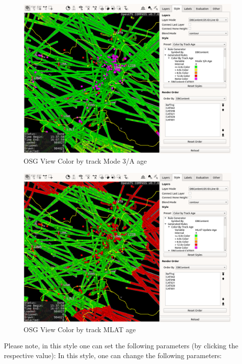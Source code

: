 \begin{figure}[H]
    \hspace*{-1.5cm}
    \includegraphics[width=17cm,frame]{figures/osgview_style_track_m3a_age.png}
  \caption{OSG View Color by track Mode 3/A age}
\end{figure}

\begin{figure}[H]
    \hspace*{-2.5cm}
    \includegraphics[width=19cm,frame]{figures/osgview_style_track_mlt_age.png}
  \caption{OSG View Color by track MLAT age}
\end{figure}

Please note, in this style one can set the following parameters (by clicking the respective value):
In this style, one can change the following parameters:

